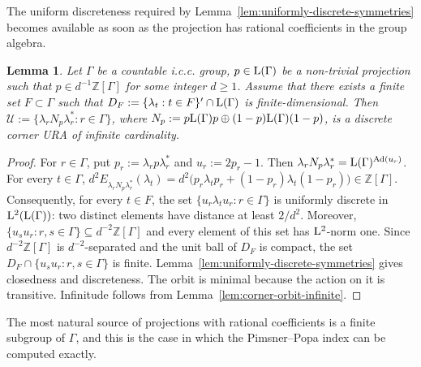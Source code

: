 \documentclass[12pt]{amsart} %
\theoremstyle{plain}
\newtheorem{lemma}[theorem]{Lemma}
\theoremstyle{definition}
\newcommand{\Z}{\mathbb{Z}}
\newcommand{\LL}{{\rm L}}
\newcommand{\Ad}{{\rm Ad}}
\begin{document}
\noindent The uniform discreteness required by
Lemma~\ref{lem:uniformly-discrete-symmetries} becomes available as soon as the
projection has rational coefficients in the group algebra.

\begin{lemma}\label{lem:rational-corner-rigidity}
Let $\Gamma$ be a countable i.c.c. group,
$p\in \LL(\Gamma)$ be a non-trivial projection such that
$p\in d^{-1}\Z[\Gamma]$ for some integer $d\geq1$. Assume that there exists a finite set
$F\subset\Gamma$ such that
$D_F:=\{\lambda_t:t\in F\}'\cap \LL(\Gamma)$
is finite-dimensional. Then
$\mathcal U:=\{\lambda_rN_p\lambda_r^*:r\in\Gamma\}$, where 
$N_p:=p\LL(\Gamma)p\oplus(1-p)\LL(\Gamma)(1-p)$,
is a discrete corner URA of infinite cardinality.
\end{lemma}
\begin{proof}
For $r\in\Gamma$, put $p_r:=\lambda_rp\lambda_r^*$ and $u_r:=2p_r-1$.
Then $\lambda_rN_p\lambda_r^*=\LL(\Gamma)^{\Ad(u_r)}$. For every $t\in\Gamma$,
$d^2E_{\lambda_rN_p\lambda_r^*}(\lambda_t)
=
d^2\bigl(p_r\lambda_tp_r+(1-p_r)\lambda_t(1-p_r)\bigr)
\in\Z[\Gamma]$. Consequently, for every $t\in F$, the set
$\{u_r\lambda_tu_r:r\in\Gamma\}$
is uniformly discrete in $\LL^2(\LL(\Gamma))$: two distinct elements have distance at
least $2/d^2$. Moreover, $\{u_su_r:r,s\in\Gamma\}\subseteq d^{-2}\Z[\Gamma]$ and every element of this set has $\LL^2$-norm one. Since
$d^{-2}\Z[\Gamma]$ is $d^{-2}$-separated and the unit ball of $D_F$ is
compact, the set
$D_F\cap\{u_su_r:r,s\in\Gamma\}$
is finite. Lemma~\ref{lem:uniformly-discrete-symmetries} gives closedness and
discreteness. The orbit is minimal because the action on it is transitive.
Infinitude follows from Lemma~\ref{lem:corner-orbit-infinite}.
\end{proof}

\noindent The most natural source of projections with rational coefficients is a
finite subgroup of $\Gamma$, and this is the case in which the Pimsner--Popa
index can be computed exactly.
\medskip
\end{document}

